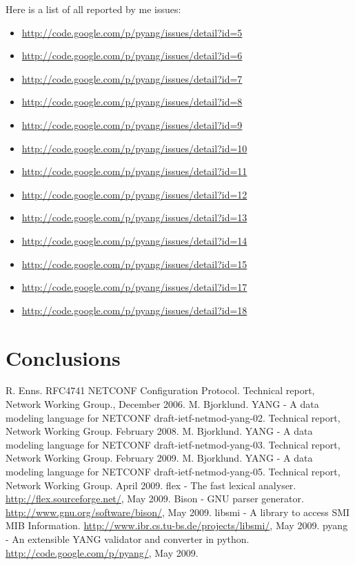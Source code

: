 \documentclass[conference]{IEEEtran}
\begin{document}
Here is a list of all reported by me issues:
\begin{itemize}
\item \url{http://code.google.com/p/pyang/issues/detail?id=5}
\item \url{http://code.google.com/p/pyang/issues/detail?id=6}
\item \url{http://code.google.com/p/pyang/issues/detail?id=7}
\item \url{http://code.google.com/p/pyang/issues/detail?id=8}
\item \url{http://code.google.com/p/pyang/issues/detail?id=9}
\item \url{http://code.google.com/p/pyang/issues/detail?id=10}
\item \url{http://code.google.com/p/pyang/issues/detail?id=11}
\item \url{http://code.google.com/p/pyang/issues/detail?id=12}
\item \url{http://code.google.com/p/pyang/issues/detail?id=13}
\item \url{http://code.google.com/p/pyang/issues/detail?id=14}
\item \url{http://code.google.com/p/pyang/issues/detail?id=15}
\item \url{http://code.google.com/p/pyang/issues/detail?id=17}
\item \url{http://code.google.com/p/pyang/issues/detail?id=18}
\end{itemize}

\section{Conclusions}

\begin{thebibliography}{1}
 R. Enns. RFC4741 NETCONF Configuration Protocol. Technical report, Network Working Group.,
December 2006.
 M. Bjorklund. YANG - A data modeling language for NETCONF draft-ietf-netmod-yang-02. Technical report, Network Working Group. February 2008.
 M. Bjorklund. YANG - A data modeling language for NETCONF draft-ietf-netmod-yang-03. Technical report, Network Working Group. February 2009.
 M. Bjorklund. YANG - A data modeling language for NETCONF draft-ietf-netmod-yang-05. Technical report, Network Working Group. April 2009.
 flex - The fast lexical analyser. \url{http://flex.sourceforge.net/}, May 2009.
 Bison - GNU parser generator. \url{http://www.gnu.org/software/bison/}, May 2009.
 libsmi - A library to access SMI MIB Information. \url{http://www.ibr.cs.tu-bs.de/projects/libsmi/}, May 2009.
 pyang - An extensible YANG validator and converter in python. \url{http://code.google.com/p/pyang/}, May 2009.

\end{thebibliography}
\end{document}
